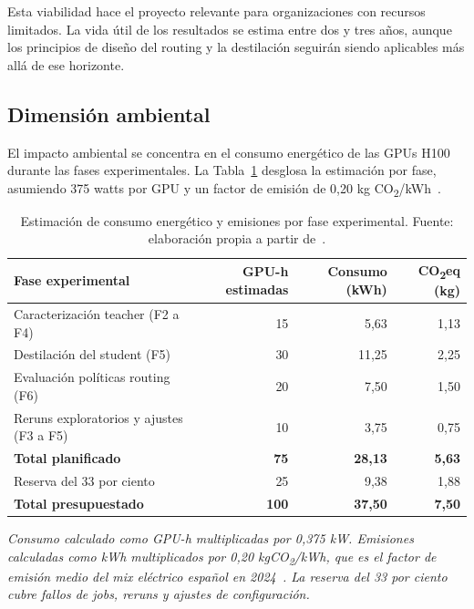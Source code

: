Esta viabilidad hace el proyecto relevante para organizaciones con recursos limitados. La vida útil de los resultados se estima entre dos y tres años, aunque los principios de diseño del routing y la destilación seguirán siendo aplicables más allá de ese horizonte.

\subsection{Dimensión ambiental}

El impacto ambiental se concentra en el consumo energético de las GPUs H100 durante las fases experimentales. La Tabla~\ref{tab:consumo-fase} desglosa la estimación por fase, asumiendo 375 watts por GPU y un factor de emisión de 0,20 kg CO\textsubscript{2}/kWh~\cite{ree2024}.

\begin{table}[H]
\centering
\caption{Estimación de consumo energético y emisiones por fase experimental. Fuente: elaboración propia a partir de~\cite{ree2024}.}
\label{tab:consumo-fase}
\footnotesize
\begin{tabular}{l r r r}
\toprule
\textbf{Fase experimental} & \textbf{GPU-h estimadas} & \textbf{Consumo (kWh)} & \textbf{CO\textsubscript{2}eq (kg)} \\
\midrule
Caracterización teacher (F2 a F4)         & 15 & 5,63  & 1,13 \\
Destilación del student (F5)              & 30 & 11,25 & 2,25 \\
Evaluación políticas routing (F6)         & 20 & 7,50  & 1,50 \\
Reruns exploratorios y ajustes (F3 a F5)  & 10 & 3,75  & 0,75 \\
\midrule
\textbf{Total planificado}                & \textbf{75} & \textbf{28,13} & \textbf{5,63} \\
\addlinespace[2pt]
Reserva del 33 por ciento                & 25 & 9,38  & 1,88 \\
\midrule
\textbf{Total presupuestado}              & \textbf{100} & \textbf{37,50} & \textbf{7,50} \\
\bottomrule
\end{tabular}
\end{table}

\noindent\textit{\scriptsize Consumo calculado como GPU-h multiplicadas por 0,375 kW. Emisiones calculadas como kWh multiplicados por 0,20 kgCO\textsubscript{2}/kWh, que es el factor de emisión medio del mix eléctrico español en 2024~\cite{ree2024}. La reserva del 33 por ciento cubre fallos de jobs, reruns y ajustes de configuración.}

